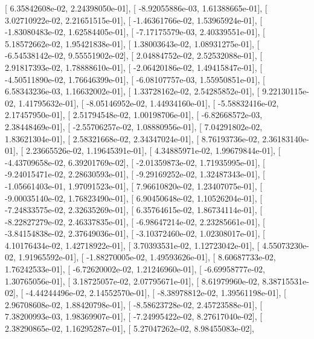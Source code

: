\documentclass{article}
\begin{document}
       [  6.35842608e-02,   2.24398050e-01],
       [ -8.92055886e-03,   1.61388665e-01],
       [  3.02710922e-02,   2.21651515e-01],
       [ -1.46361766e-02,   1.53965924e-01],
       [ -1.83080483e-02,   1.62584405e-01],
       [ -7.17175579e-03,   2.40339551e-01],
       [  5.18572662e-02,   1.95421838e-01],
       [  1.38003643e-02,   1.08931275e-01],
       [ -6.54538142e-02,   9.55551902e-02],
       [  2.04884752e-02,   2.52532088e-01],
       [  2.91817393e-02,   1.78888610e-01],
       [ -2.06420186e-02,   1.49415847e-01],
       [ -4.50511890e-02,   1.76646399e-01],
       [ -6.08107757e-03,   1.55950851e-01],
       [  6.58343236e-03,   1.16632002e-01],
       [  1.33728162e-02,   2.54285852e-01],
       [  9.22130115e-02,   1.41795632e-01],
       [ -8.05146952e-02,   1.44934160e-01],
       [ -5.58832416e-02,   2.17457950e-01],
       [  2.51794548e-02,   1.00198706e-01],
       [ -6.82668572e-03,   2.38448469e-01],
       [ -2.55706257e-02,   1.08880956e-01],
       [  7.04291802e-02,   1.83621304e-01],
       [  2.58321668e-02,   2.34347024e-01],
       [  8.76193736e-02,   2.36183140e-01],
       [  2.23665526e-02,   1.19645391e-01],
       [  4.34885971e-02,   1.99679844e-01],
       [ -4.43709658e-02,   6.39201769e-02],
       [ -2.01359873e-02,   1.71935995e-01],
       [ -9.24015471e-02,   2.28630593e-01],
       [ -9.29169252e-02,   1.32487343e-01],
       [ -1.05661403e-01,   1.97091523e-01],
       [  7.96610820e-02,   1.23407075e-01],
       [ -9.00035140e-02,   1.76823490e-01],
       [  6.90450648e-02,   1.10526204e-01],
       [ -7.24833575e-02,   2.32635269e-01],
       [  6.35764615e-02,   1.86734114e-01],
       [ -8.22827279e-02,   2.46337835e-01],
       [ -6.98647214e-02,   2.23285661e-01],
       [ -3.84154838e-02,   2.37649036e-01],
       [ -3.10372460e-02,   1.02308017e-01],
       [  4.10176434e-02,   1.42718922e-01],
       [  3.70393531e-02,   1.12723042e-01],
       [  4.55073230e-02,   1.91965592e-01],
       [ -1.88270005e-02,   1.49593626e-01],
       [  8.60687733e-02,   1.76242533e-01],
       [ -6.72620002e-02,   1.21246960e-01],
       [ -6.69958777e-02,   1.30765056e-01],
       [  3.18725057e-02,   2.07795671e-01],
       [  8.61979960e-02,   8.38715531e-02],
       [ -4.44244496e-02,   2.14552570e-01],
       [ -8.38978812e-02,   1.39561198e-01],
       [  2.96708608e-02,   1.88420798e-01],
       [ -8.58623728e-02,   2.45723588e-01],
       [  7.38200993e-03,   1.98369907e-01],
       [ -7.24995422e-02,   8.27617040e-02],
       [  2.38290865e-02,   1.16295287e-01],
       [  5.27047262e-02,   8.98455083e-02],
\end{document}
